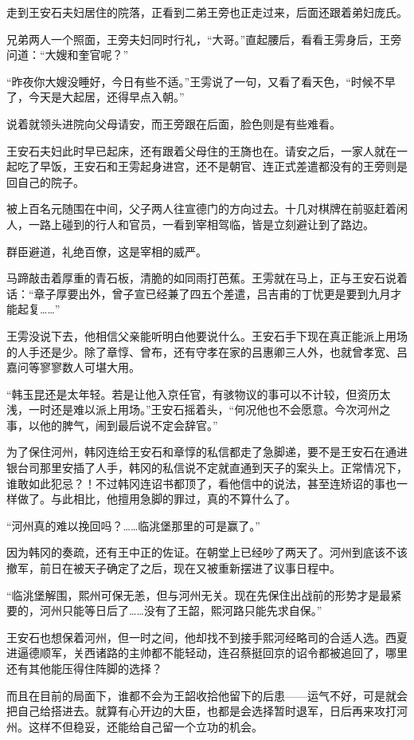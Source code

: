 走到王安石夫妇居住的院落，正看到二弟王旁也正走过来，后面还跟着弟妇庞氏。

兄弟两人一个照面，王旁夫妇同时行礼，“大哥。”直起腰后，看看王雱身后，王旁问道：“大嫂和奎官呢？”

“昨夜你大嫂没睡好，今日有些不适。”王雱说了一句，又看了看天色，“时候不早了，今天是大起居，还得早点入朝。”

说着就领头进院向父母请安，而王旁跟在后面，脸色则是有些难看。

王安石夫妇此时早已起床，还有跟着父母住的王旖也在。请安之后，一家人就在一起吃了早饭，王安石和王雱起身进宫，还不是朝官、连正式差遣都没有的王旁则是回自己的院子。

被上百名元随围在中间，父子两人往宣德门的方向过去。十几对棋牌在前驱赶着闲人，一路上碰到的行人和官员，一看到宰相驾临，皆是立刻避让到了路边。

群臣避道，礼绝百僚，这是宰相的威严。

马蹄敲击着厚重的青石板，清脆的如同雨打芭蕉。王雱就在马上，正与王安石说着话：“章子厚要出外，曾子宣已经兼了四五个差遣，吕吉甫的丁忧更是要到九月才能起复……”

王雱没说下去，他相信父亲能听明白他要说什么。王安石手下现在真正能派上用场的人手还是少。除了章惇、曾布，还有守孝在家的吕惠卿三人外，也就曾孝宽、吕嘉问等寥寥数人可堪大用。

“韩玉昆还是太年轻。若是让他入京任官，有骇物议的事可以不计较，但资历太浅，一时还是难以派上用场。”王安石摇着头，“何况他也不会愿意。今次河州之事，以他的脾气，闹到最后说不定会辞官。”

为了保住河州，韩冈连给王安石和章惇的私信都走了急脚递，要不是王安石在通进银台司那里安插了人手，韩冈的私信说不定就直通到天子的案头上。正常情况下，谁敢如此犯忌？！不过韩冈连诏书都顶了，看他信中的说法，甚至连矫诏的事也一样做了。与此相比，他擅用急脚的罪过，真的不算什么了。

“河州真的难以挽回吗？……临洮堡那里的可是赢了。”

因为韩冈的奏疏，还有王中正的佐证。在朝堂上已经吵了两天了。河州到底该不该撤军，前日在被天子确定了之后，现在又被重新摆进了议事日程中。

“临洮堡解围，熙州可保无恙，但与河州无关。现在先保住出战前的形势才是最紧要的，河州只能等日后了……没有了王韶，熙河路只能先求自保。”

王安石也想保着河州，但一时之间，他却找不到接手熙河经略司的合适人选。西夏进逼德顺军，关西诸路的主帅都不能轻动，连召蔡挺回京的诏令都被追回了，哪里还有其他能压得住阵脚的选择？

而且在目前的局面下，谁都不会为王韶收拾他留下的后患——运气不好，可是就会把自己给搭进去。就算有心开边的大臣，也都是会选择暂时退军，日后再来攻打河州。这样不但稳妥，还能给自己留一个立功的机会。

